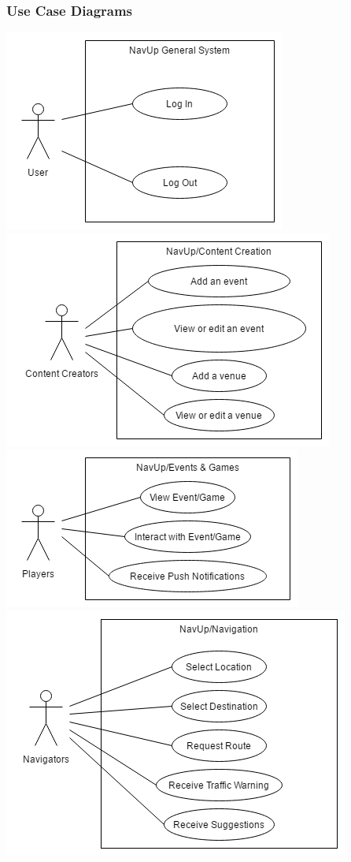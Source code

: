\documentclass[english]{article}
\begin{document}
				    \subsubsection{Use Case Diagrams}
						\begin{center}
							 \includegraphics[scale = 0.8]{NavUp_General.png}
					   \includegraphics[scale=0.7]{NavUp_Content_Creation.png}
					   \includegraphics[scale=0.8]{NavUp_Events_and_Games.png}
					   \includegraphics[scale=0.8]{NavUp_Navigation.png}

\end{center}
\end{document}

